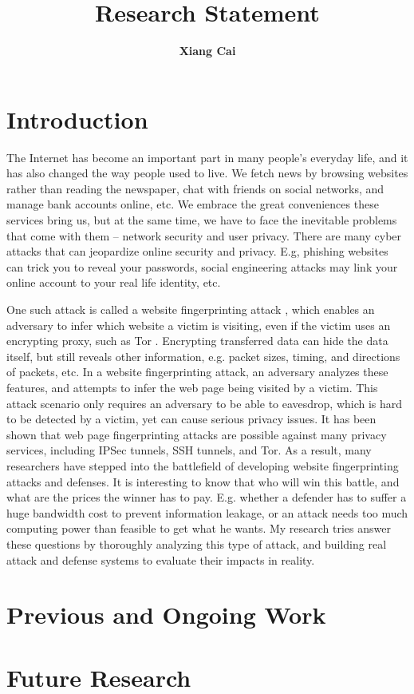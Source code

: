 \documentclass[11pt,oneside]{article}
\begin{document}
\title{\textbf{Research Statement}}
\author{\textbf{Xiang Cai}}
\date{}

\maketitle

\section{Introduction}

The Internet has become an important part in many people's everyday life, and it has also changed the way people used to live. We fetch news by browsing websites rather than reading the newspaper, chat with friends on social networks, and manage bank accounts online, etc. We embrace the great conveniences these services bring us, but at the same time, we have to face the inevitable problems that come with them -- network security and user privacy. There are many cyber attacks that can jeopardize online security and privacy. E.g, phishing websites can trick you to reveal your passwords, social engineering attacks may link your online account to your real life identity, etc.

One such attack is called a website fingerprinting attack \cite{hintz-pets02}, which enables an adversary to infer which website a victim is visiting, even if the victim uses an encrypting proxy, such as Tor \cite{tor-website}. Encrypting transferred data can hide the data itself, but still reveals other information, e.g. packet sizes, timing, and directions of packets, etc. In a website fingerprinting attack, an adversary analyzes these features, and attempts to infer the web page being visited by a victim. This attack scenario only requires an adversary to be able to eavesdrop, which is hard to be detected by a victim, yet can cause serious privacy issues. It has been shown that web page fingerprinting attacks are possible against many privacy services, including IPSec tunnels, SSH tunnels, and Tor. As a result, many researchers have stepped into the battlefield of developing website fingerprinting attacks and defenses. It is interesting to know that who will win this battle, and what are the prices the winner has to pay. E.g. whether a defender has to suffer a huge bandwidth cost to prevent information leakage, or an attack needs too much computing power than feasible to get what he wants. My research tries answer these questions by thoroughly analyzing this type of attack, and building real attack and defense systems to evaluate their impacts in reality.

\section{Previous and Ongoing Work}



\section{Future Research}




\end{document}
